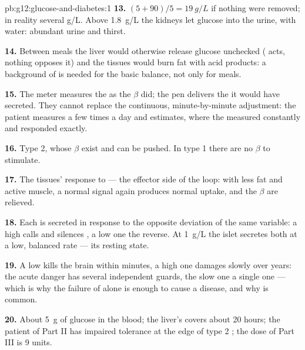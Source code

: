 \begin{solution}{pb:g12:glucose-and-diabetes:1}
\textbf{13.} $(5 + 90)/5 = \qty{19}{g/L}$ if nothing were removed; in
reality several \unit{g/L}. Above \qty{1.8}{g/L} the kidneys let
glucose into the urine, with water: abundant urine and thirst.

\textbf{14.} Between meals the liver would otherwise release glucose
unchecked ( acts, nothing opposes it) and the tissues would
burn fat with acid products: a background of  is needed for the
basic balance, not only for meals.

\textbf{15.} The meter measures the  as the $\beta$  did;
the pen delivers the  it would have secreted. They cannot
replace the continuous, minute-by-minute adjustment: the patient
measures a few times a day and estimates, where the  measured
constantly and responded exactly.

\textbf{16.} Type 2, whose $\beta$  exist and can be pushed. In
type 1 there are no $\beta$  to stimulate.

\textbf{17.} The tissues' response to  --- the effector side of
the loop: with less fat and active muscle, a normal  signal
again produces normal uptake, and the $\beta$  are relieved.

\textbf{18.} Each is secreted in response to the opposite deviation of
the same variable: a high  calls  and silences
, a low one the reverse. At \qty{1}{g/L} the islet secretes
both at a low, balanced rate --- its resting state.

\textbf{19.} A low  kills the brain within minutes, a high one
damages slowly over years: the acute danger has several independent
guards, the slow one a single one --- which is why the failure of
 alone is enough to cause a disease, and why  is
common.

\textbf{20.} About \qty{5}{g} of glucose in the blood; the liver's
 covers about 20 hours; the patient of Part II has impaired
tolerance at the edge of type 2 ; the dose of Part III is 9
units.
\end{solution}
